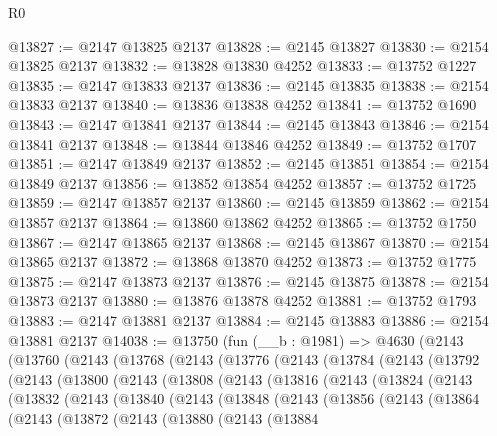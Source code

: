 \begin{lexlean}{R0}
\begin{coremodule}
@13827 := @2147 @13825 @2137
@13828 := @2145 @13827
@13830 := @2154 @13825 @2137
@13832 := @13828 @13830 @4252
@13833 := @13752 @1227
@13835 := @2147 @13833 @2137
@13836 := @2145 @13835
@13838 := @2154 @13833 @2137
@13840 := @13836 @13838 @4252
@13841 := @13752 @1690
@13843 := @2147 @13841 @2137
@13844 := @2145 @13843
@13846 := @2154 @13841 @2137
@13848 := @13844 @13846 @4252
@13849 := @13752 @1707
@13851 := @2147 @13849 @2137
@13852 := @2145 @13851
@13854 := @2154 @13849 @2137
@13856 := @13852 @13854 @4252
@13857 := @13752 @1725
@13859 := @2147 @13857 @2137
@13860 := @2145 @13859
@13862 := @2154 @13857 @2137
@13864 := @13860 @13862 @4252
@13865 := @13752 @1750
@13867 := @2147 @13865 @2137
@13868 := @2145 @13867
@13870 := @2154 @13865 @2137
@13872 := @13868 @13870 @4252
@13873 := @13752 @1775
@13875 := @2147 @13873 @2137
@13876 := @2145 @13875
@13878 := @2154 @13873 @2137
@13880 := @13876 @13878 @4252
@13881 := @13752 @1793
@13883 := @2147 @13881 @2137
@13884 := @2145 @13883
@13886 := @2154 @13881 @2137
@14038 := @13750
    (fun (__b : @1981) =>
    @4630
      (@2143
        (@13760
          (@2143
            (@13768
              (@2143
                (@13776
                  (@2143
                    (@13784
                      (@2143
                        (@13792
                          (@2143
                            (@13800
                              (@2143
                                (@13808
                                  (@2143
                                    (@13816
                                      (@2143
                                        (@13824
                                          (@2143
                                            (@13832
                                              (@2143
                                                (@13840
                                                  (@2143
                                                    (@13848
                                                      (@2143
                                                        (@13856
                                                          (@2143
                                                            (@13864
                                                              (@2143
                                                                (@13872
                                                                  (@2143
                                                                    (@13880
                                                                      (@2143
                                                                        (@13884

\end{coremodule}
\end{lexlean}
